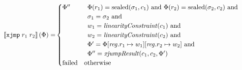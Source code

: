 \documentclass[a4paper]{article}
\begin{document}
\begin{align*}
  \sem{\txjmp{r_1}{r_2}}(\Phi) = &
                                   \begin{cases}
                                       \Phi''
                                     &
                                     \begin{array}[t]{l}
                                       \Phi(r_1) = \sealed{\sigma_1,c_1} \tand
                                       \Phi(r_2) = \sealed{\sigma_2,c_2} \tand\\
                                       \sigma_1 = \sigma_2 \tand \\
                                       w_1 = \linCons{c_1} \tand \\
                                       w_2 = \linCons{c_2} \tand \\
                                       \Phi' = \Phi \updReg{r_1}{w_1} \updReg{r_2}{w_2} \tand\\
                                       \Phi'' = \xjumpResult{c_1}{c_2}{\Phi'}
                                     \end{array}\\
                                     \failed & \totherwise
                                   \end{cases}
\end{align*}
\end{document}
